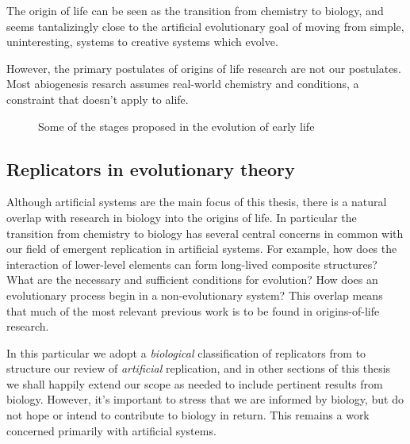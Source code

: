 The origin of life can be seen as the transition from chemistry to biology, and seems tantalizingly close to the artificial evolutionary goal of moving from simple, uninteresting, systems to creative systems which evolve. 

However, the primary postulates of origins of life research are not our postulates. Most abiogenesis resarch assumes real-world chemistry and conditions, a constraint that doesn't apply to \gls{alife}. 

\begin{figure}
	\begin{center}
	\end{center}
	\caption{Some of the stages proposed in the evolution of early life}
	\label{major-stages-early-life}
\end{figure}


\subsection{Replicators in evolutionary theory}\label{replicators-in-evolutionary-theory}

Although artificial systems are the main focus of this thesis, there is a natural overlap with research in biology into the origins of life. In particular the transition from chemistry to biology has several central concerns in common with our field of emergent replication in artificial systems. For example, how does the interaction of lower-level elements can form long-lived composite structures? What are the necessary and sufficient conditions for evolution? How does an evolutionary process begin in a non-evolutionary system? This overlap means that much of the most relevant previous work is to be found in origins-of-life research. 

In this particular  we adopt a \textit{biological} classification of replicators from \textcite{Zachar2010} to structure our review of \textit{artificial} replication, and in other sections of this thesis we shall happily extend our scope as needed to include pertinent results from biology. However, it's important to stress that we are informed by biology, but do not hope or intend to contribute to biology in return. This remains a work concerned primarily with artificial systems. 

